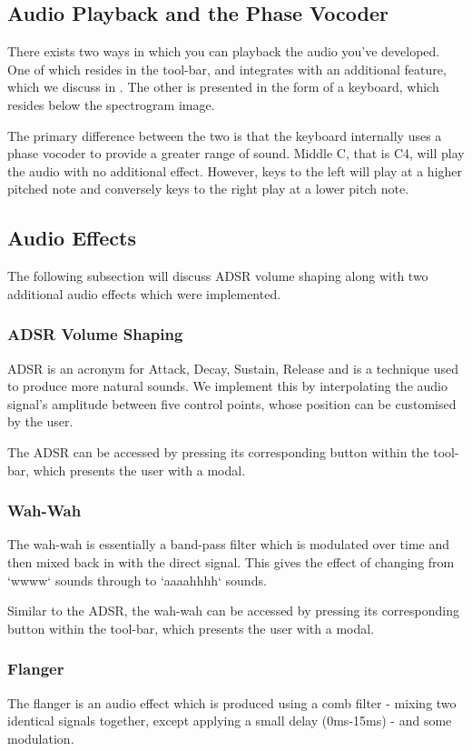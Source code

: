 \documentclass{coursework}
\begin{document}
		\subsection{Audio Playback and the Phase Vocoder}
			There exists two ways in which you can playback the audio you've developed. One of which resides in the tool-bar, and integrates with an additional feature, which we discuss in . The other is presented in the form of a keyboard, which resides below the spectrogram image.
			
			The primary difference between the two is that the keyboard internally uses a phase vocoder to provide a greater range of sound. Middle C, that is C4, will play the audio with no additional effect. However, keys to the left will play at a higher pitched note and conversely keys to the right play at a lower pitch note.
			
		\subsection{Audio Effects}
			The following subsection will discuss ADSR volume shaping along with two additional audio effects which were implemented.
			
			\subsubsection{ADSR Volume Shaping}
				ADSR is an acronym for Attack, Decay, Sustain, Release and is a technique used to produce more natural sounds. We implement this by interpolating the audio signal's amplitude between five control points, whose position can be customised by the user.
				
				The ADSR can be accessed by pressing its corresponding button within the tool-bar, which presents the user with a modal.

			\subsubsection{Wah-Wah}
				The wah-wah is essentially a band-pass filter which is modulated over time and then mixed back in with the direct signal. This gives the effect of changing from `wwww` sounds through to `aaaahhhh` sounds.
				
				Similar to the ADSR, the wah-wah can be accessed by pressing its corresponding button within the tool-bar, which presents the user with a modal.
			
			\subsubsection{Flanger}
				The flanger is an audio effect which is produced using a comb filter - mixing two identical signals together, except applying a small delay (0ms-15ms) - and some modulation.
				
\end{document}
